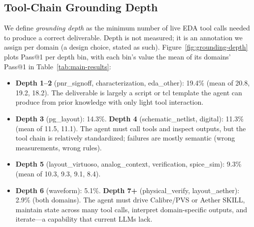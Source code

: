 \subsection{Tool-Chain Grounding Depth}
\label{sec:grounding-depth}

We define \emph{grounding depth} as the minimum number of live EDA tool calls needed to produce a correct deliverable. Depth is not measured; it is an annotation we assign per domain (a design choice, stated as such). Figure~\ref{fig:grounding-depth} plots Pass@1 per depth bin, with each bin's value the mean of its domains' Pass@1 in Table~\ref{tab:main-results}:

\begin{itemize}
    \item \textbf{Depth 1--2} (pnr\_signoff, characterization, eda\_other): 19.4\% (mean of 20.8, 19.2, 18.2). The deliverable is largely a script or tcl template the agent can produce from prior knowledge with only light tool interaction.
    \item \textbf{Depth 3} (pg\_layout): 14.3\%. \textbf{Depth 4} (schematic\_netlist, digital): 11.3\% (mean of 11.5, 11.1). The agent must call tools and inspect outputs, but the tool chain is relatively standardized; failures are mostly semantic (wrong measurements, wrong rules).
    \item \textbf{Depth 5} (layout\_virtuoso, analog\_context, verification, spice\_sim): 9.3\% (mean of 10.3, 9.3, 9.1, 8.4).
    \item \textbf{Depth 6} (waveform): 5.1\%. \textbf{Depth 7+} (physical\_verify, layout\_aether): 2.9\% (both domains). The agent must drive Calibre/PVS or Aether SKILL, maintain state across many tool calls, interpret domain-specific outputs, and iterate---a capability that current LLMs lack.
\end{itemize}

